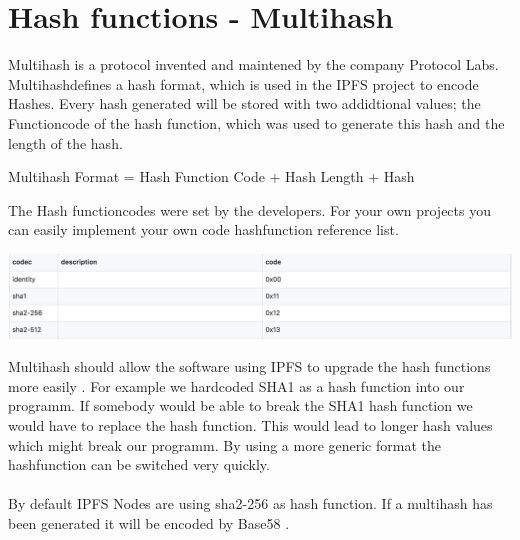 \documentclass[a4paper,11pt, oneside]{report}
\theoremstyle{definition}
\begin{document}
\section{Hash functions - Multihash}
Multihash is a protocol invented and maintened by the company Protocol Labs. Multihashdefines a hash format, which is used in the IPFS project to encode Hashes. Every hash generated will be stored with two addidtional values; the Functioncode of the  hash function, which was used to generate this hash and the length of the hash.
\begin{center}
	Multihash Format = Hash Function Code + Hash Length + Hash
\end{center}
The Hash functioncodes were set by the developers. For your own projects you can easily implement your own code hashfunction reference list.
\begin{center}
	\includegraphics[width=\textwidth]{img/multiformat_hashfunctionid.png}
\end{center}
Multihash should allow the software using IPFS to upgrade the hash functions more easily \cite{multihash}. For example we hardcoded SHA1 as a hash function into our programm. If somebody would be able to break the SHA1 hash function we would have to replace the hash function. This would lead to longer hash values which might break our programm. By using a more generic format the hashfunction can be switched very quickly.\\ \\
By default IPFS Nodes are using sha2-256 as hash function. If a multihash has been generated it will be encoded by Base58 \cite{Encoding}.
\newpage
\end{document}
